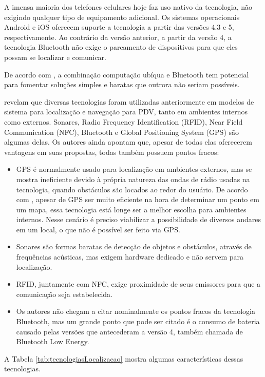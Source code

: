 \documentclass[twoside,english,brazilian]{UNISINOSartigo}
\begin{document}
A imensa maioria dos telefones celulares hoje faz uso nativo da tecnologia, não exigindo qualquer tipo de equipamento adicional. Os sistemas operacionais Android e iOS oferecem suporte a tecnologia a partir das versões 4.3 e 5, respectivamente. Ao contrário da versão anterior, a partir da versão 4, a tecnologia Bluetooth não exige o pareamento de dispositivos para que eles possam se localizar e comunicar.

De acordo com , a combinação computação ubíqua e Bluetooth tem potencial para fomentar soluções simples e baratas que outrora não seriam possíveis.

 revelam que diversas tecnologias foram utilizadas anteriormente em modelos de sistema para localização e navegação para PDV, tanto em ambientes internos como externos. Sonares, Radio Frequency Identification (RFID), Near Field Communication (NFC), Bluetooth e Global Positioning System (GPS) são algumas delas. Os autores ainda apontam que, apesar de todas elas oferecerem vantagens em suas propostas, todas também possuem pontos fracos:

\begin{itemize}
  \item GPS é normalmente usado para localização em ambientes externos, mas se mostra ineficiente devido à própria natureza das ondas de rádio usadas na tecnologia, quando obstáculos são locados ao redor do usuário. De acordo com , apesar de GPS ser muito eficiente na hora de determinar um ponto em um mapa, essa tecnologia está longe ser a melhor escolha para ambientes internos. Nesse cenário é preciso viabilizar a possibilidade de diversos andares em um local, o que não é possível ser feito via GPS.
  \item Sonares são formas baratas de detecção de objetos e obstáculos, através de frequências acústicas, mas exigem hardware dedicado e não servem para localização.
  \item RFID, juntamente com NFC, exige proximidade de seus emissores para que a comunicação seja estabelecida.
  \item Os autores não chegam a citar nominalmente os pontos fracos da tecnologia Bluetooth, mas um grande ponto que pode ser citado é o consumo de bateria causado pelas versões que antecederam a versão 4, também chamada de Bluetooth Low Energy.
\end{itemize}

A Tabela \ref{tab:tecnologiasLocalizacao} mostra algumas características dessas tecnologias.
\end{document}
